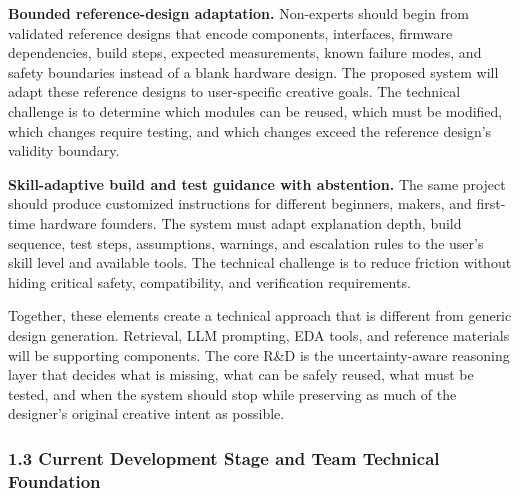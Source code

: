 \textbf{Bounded reference-design adaptation.} 
Non-experts should begin from validated reference designs that encode components, interfaces, firmware dependencies, build steps, expected measurements, known failure modes, and safety boundaries instead of a blank hardware design.
The proposed system will adapt these reference designs to user-specific creative goals. The technical challenge is to determine which modules can be reused, which must be modified, which changes require testing, and which changes exceed the reference design's validity boundary.

\textbf{Skill-adaptive build and test guidance with abstention.} 
The same project should produce customized instructions for different beginners,    makers, and first-time hardware founders. 
The system must adapt explanation depth, build sequence, test steps, assumptions, warnings, and escalation rules to the user's skill level and available tools. 
The technical challenge is to reduce friction without hiding critical safety, compatibility, and verification requirements.

Together, these elements create a technical approach that is different from generic design generation. Retrieval, LLM prompting, EDA tools, and reference materials will be supporting components. The core R\&D is the uncertainty-aware reasoning layer that decides what is missing, what can be safely reused, what must be tested, and when the system should stop while preserving as much of the designer’s original creative intent as possible.




\subsubsection*{1.3 Current Development Stage and Team Technical Foundation}

